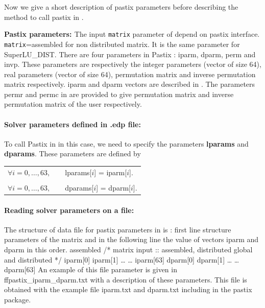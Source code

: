 \documentclass[a4paper,twoside,12pt]{book}
\begin{document}
Now we give a short description of pastix parameters before describing the method to call pastix in \freefempp.

\begin{paragraph}
{\bf{Pastix parameters: }}
The input {\texttt{matrix}} parameter of \freefempp depend on pastix interface.  {\texttt{matrix}}=assembled for non distributed matrix.  It is the same parameter for SuperLU\_DIST. There are four parameters in Pastix : iparm, dparm, perm and invp. These parameters are respectively the integer parameters (vector of size 64),
real parameters (vector of size 64), permutation matrix and inverse permutation matrix respectively. iparm and dparm vectors are described in \cite{pastixrefcard}.
The parameters permr and permc in \freefempp are provided to give permutation matrix and inverse permutation matrix  of the user respectively.
\end{paragraph}

\vspace*{0.5cm}
\paragraph{Solver parameters defined in .edp file:}
To call Pastix in \freefempp in this case, we need to specify the parameters {\bf{lparams}} and {\bf{dparams}}. These parameters are defined by \\
\begin{center}
\begin{tabular}{ll}
$\forall i=0,\ldots,63, \quad$ & lparams[$i$] = iparm[$i$].\\
\\
$\forall i=0,\ldots,63, \quad$ & dparams[$i$] = dparm[$i$].
\end{tabular}
\end{center}

\vspace*{0.5cm}
\paragraph{Reading solver parameters on a file:}
The structure of data file for pastix parameters in \freefempp is :  first line structure parameters of the matrix and in the following line the value of vectors iparm and dparm in this order.
\bFF
assembled  /* matrix input :: assembled, distributed global and distributed */
iparm[0]
iparm[1]
\ldots
\ldots
iparm[63]
dparm[0]
dparm[1]
\ldots
\ldots
dparm[63]
\eFF
An example of this file parameter is given in ffpastix\_iparm\_dparm.txt with a description of these parameters. This file is obtained with the example file iparm.txt and
dparm.txt including in the pastix package. \\
\end{document}

